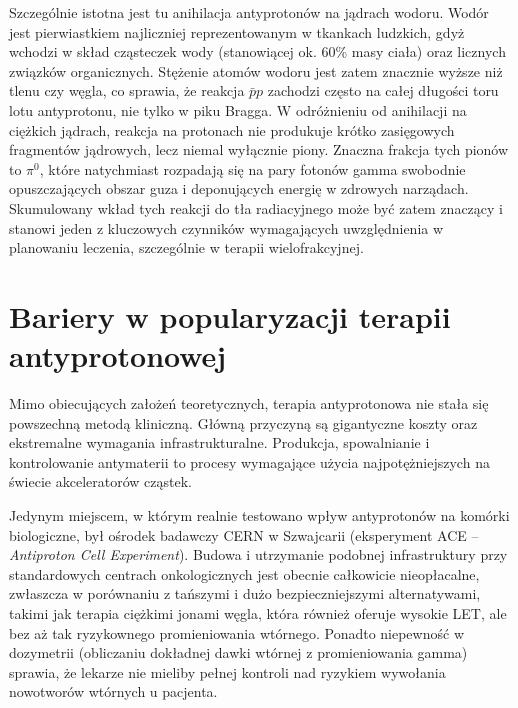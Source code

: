 \documentclass{article}
\begin{document}
Szczególnie istotna jest tu anihilacja antyprotonów na jądrach wodoru. Wodór jest pierwiastkiem najliczniej reprezentowanym w tkankach ludzkich, gdyż wchodzi w skład cząsteczek wody (stanowiącej ok. 60\% masy ciała) oraz licznych związków organicznych. Stężenie atomów wodoru jest zatem znacznie wyższe niż tlenu czy węgla, co sprawia, że reakcja $\bar{p}p$ zachodzi często na całej długości toru lotu antyprotonu, nie tylko w piku Bragga. W odróżnieniu od anihilacji na ciężkich jądrach, reakcja na protonach nie produkuje krótko zasięgowych fragmentów jądrowych, lecz niemal wyłącznie piony. Znaczna frakcja tych pionów to $\pi^0$, które natychmiast rozpadają się na pary fotonów gamma swobodnie opuszczających obszar guza i deponujących energię w zdrowych narządach. Skumulowany wkład tych reakcji do tła radiacyjnego może być zatem znaczący i stanowi jeden z kluczowych czynników wymagających uwzględnienia w planowaniu leczenia, szczególnie w terapii wielofrakcyjnej.

\section{Bariery w popularyzacji terapii antyprotonowej}
Mimo obiecujących założeń teoretycznych, terapia antyprotonowa nie stała się powszechną metodą kliniczną. Główną przyczyną są gigantyczne koszty oraz ekstremalne wymagania infrastrukturalne. Produkcja, spowalnianie i kontrolowanie antymaterii to procesy wymagające użycia najpotężniejszych na świecie akceleratorów cząstek.

Jedynym miejscem, w którym realnie testowano wpływ antyprotonów na komórki biologiczne, był ośrodek badawczy CERN w Szwajcarii (eksperyment ACE -- \textit{Antiproton Cell Experiment}). Budowa i utrzymanie podobnej infrastruktury przy standardowych centrach onkologicznych jest obecnie całkowicie nieopłacalne, zwłaszcza w porównaniu z tańszymi i dużo bezpieczniejszymi alternatywami, takimi jak terapia ciężkimi jonami węgla, która również oferuje wysokie LET, ale bez aż tak ryzykownego promieniowania wtórnego. Ponadto niepewność w dozymetrii (obliczaniu dokładnej dawki wtórnej z promieniowania gamma) sprawia, że lekarze nie mieliby pełnej kontroli nad ryzykiem wywołania nowotworów wtórnych u pacjenta.
\end{document}
